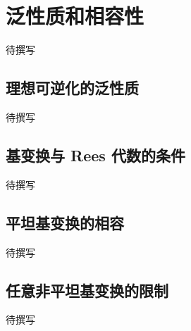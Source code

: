
% 
% 
% 

\section{泛性质和相容性}
\label{g5:sec:1404}

待撰写

\subsection{理想可逆化的泛性质}
\label{g5:subsec:1404:01}
待撰写

\subsection{基变换与 Rees 代数的条件}
\label{g5:subsec:1404:02}
待撰写

\subsection{平坦基变换的相容}
\label{g5:subsec:1404:03}
待撰写

\subsection{任意非平坦基变换的限制}
\label{g5:subsec:1404:04}
待撰写
